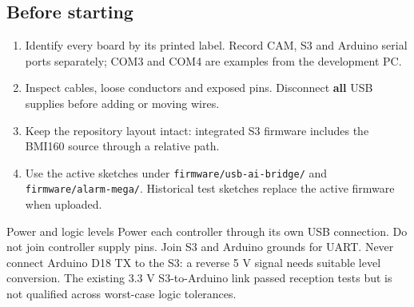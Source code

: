 \documentclass[11pt,a4paper]{article}
\newcommand{\file}[1]{\nolinkurl{#1}}
\begin{document}
\subsection{Before starting}
\begin{enumerate}
\item Identify every board by its printed label. Record CAM, S3 and Arduino serial ports separately; COM3 and COM4 are examples from the development PC.
\item Inspect cables, loose conductors and exposed pins. Disconnect \textbf{all} USB supplies before adding or moving wires.
\item Keep the repository layout intact: integrated S3 firmware includes the BMI160 source through a relative path.
\item Use the active sketches under \file{firmware/usb-ai-bridge/} and \file{firmware/alarm-mega/}. Historical test sketches replace the active firmware when uploaded.
\end{enumerate}
\begin{note}{Power and logic levels}
Power each controller through its own USB connection. Do not join controller supply pins. Join S3 and Arduino grounds for UART. Never connect Arduino D18 TX to the S3: a reverse 5 V signal needs suitable level conversion. The existing 3.3 V S3-to-Arduino link passed reception tests but is not qualified across worst-case logic tolerances.
\end{note}
\end{document}
